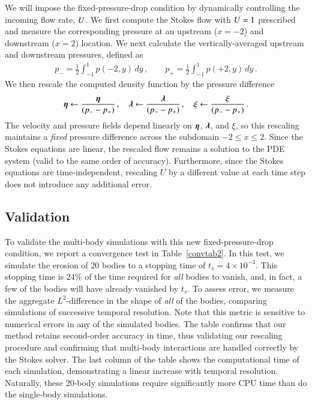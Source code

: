 \documentclass[preprint, 10pt]{elsarticle}
\begin{document}
We will impose the fixed-pressure-drop condition by dynamically controlling the incoming flow rate, $U$. We first compute the Stokes flow with $U = 1$ prescribed and measure the corresponding pressure at an upstream ($x = -2$) and downstream ($x=2$) location. We next calculate the vertically-averaged upstream and downstream pressures, defined as
\begin{align}
p_{-} = \frac{1}{2} \int_{-1}^{1} p(-2,y) \, dy \, , \qquad
p_{+} = \frac{1}{2} \int_{-1}^{1} p(+2,y) \, dy \, .
\end{align}
We then rescale the computed density function by the pressure difference
\begin{align}
{\boldsymbol\eta} \leftarrow \frac{{\boldsymbol\eta}}{(p_{-} - p_{+})}\, , \quad 
{\boldsymbol\lambda} \leftarrow \frac{{\boldsymbol\lambda}}{(p_{-} - p_{+})}\, , \quad 
\xi \leftarrow \frac{\xi}{(p_{-} - p_{+})}\, .
\end{align}
The velocity and pressure fields depend linearly on ${\boldsymbol\eta}$,
${\boldsymbol\lambda}$, and $\xi$, so this rescaling maintains a {\em fixed} pressure difference across the subdomain $-2 \le x \le 2$. Since the Stokes equations are linear, the rescaled flow remains a solution to the PDE system (valid to the same order of accuracy). Furthermore, since the Stokes equations are time-independent, rescaling $U$ by a different value at each time step does not introduce any additional error.

\subsection{Validation}

To validate the multi-body simulations with this new
fixed-pressure-drop condition, we report a convergence test in
Table~\ref{convtab2}. In this test, we simulate the erosion of 20 bodies to a
stopping time of $t_s = 4 \times 10^{-3}$. This stopping time is 24\% of
the time required for {\em all} bodies to vanish, and, in fact, a few of
the bodies will have already vanished by $t_s$. To assess error, we
measure the aggregate $L^2$-difference in the shape of {\em all} of the
bodies, comparing simulations of successive temporal resolution. Note
that this metric is sensitive to numerical errors in any of the
simulated bodies. The table confirms that our method retains
second-order accuracy in time, thus validating our rescaling procedure
and confirming that multi-body interactions are handled correctly by the Stokes solver. The last column of the table shows the computational time of each simulation, demonstrating a linear increase with temporal resolution. Naturally, these 20-body simulations require significantly more CPU time than do the single-body simulations.
\end{document}
